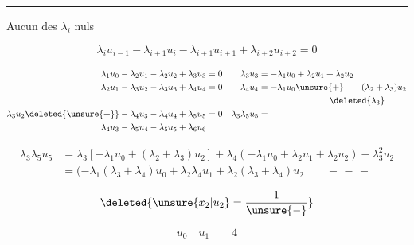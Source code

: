 \noindent\rule{\linewidth}{.3pt}

Aucun des $\lambda_i$ nuls 

\[
\lambda_i u_{i-1}-\lambda_{i+1}u_i-\lambda_{i+1}u_{i+1}+\lambda_{i+2}u_{i+2}=0
\]

\[
\begin{aligned}
\lambda_1u_0-\lambda_2u_1-\lambda_2u_2+\lambda_3u_3&=0
&\lambda_3u_3&=-\lambda_1u_0+\lambda_2u_1+\lambda_2u_2\\
\lambda_2u_1-\lambda_3u_2-\lambda_3u_3+\lambda_4u_4&=0
&\lambda_4u_4&=-\lambda_1u_0\unsure{+}\qquad(\lambda_2+\lambda_3)u_2\\
&&&\hspace{8em}\deleted{\lambda_3}\\
\lambda_3u_2\deleted{\unsure{+}}-\lambda_4u_3-\lambda_4u_4+\lambda_5u_5&=0
&\lambda_3\lambda_5u_5&=\\
\lambda_4u_3-\lambda_5u_4-\lambda_5u_5+\lambda_6u_6&&&
\end{aligned}
\]

\[
\begin{aligned}
\lambda_3\lambda_5u_5&=\lambda_3[-\lambda_1u_0+(\lambda_2+\lambda_3)u_2]
+\lambda_4(-\lambda_1u_0+\lambda_2u_1+\lambda_2u_2)-\lambda_3^2u_2\\
&=(-\lambda_1(\lambda_3+\lambda_4)u_0+\lambda_2\lambda_4u_1+
\lambda_2(\lambda_3+\lambda_4)u_2\qquad -\, -\, -
\end{aligned}
\]

\[
\deleted{\unsure{x_2|u_2}=\frac{1}{\unsure{\vphantom{1}\smash{-}}}}
\]

\[
u_0\quad u_1\qquad 4
\]

